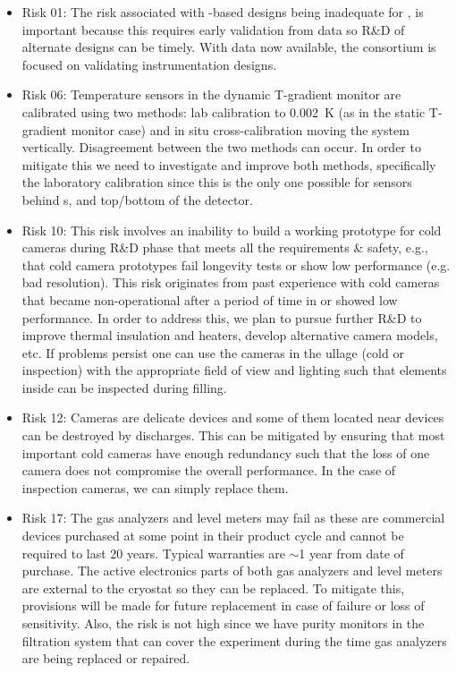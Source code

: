 \begin{itemize}
    \item Risk 01: The risk associated with -based designs being inadequate for , is important because this requires early validation from  data so R\&D of alternate designs can be timely. With  data now available, the consortium is focused on validating instrumentation designs. 
    \item Risk 06: Temperature sensors in the dynamic T-gradient monitor are calibrated using two methods: lab calibration to \SI{0.002}{K}  (as in the static T-gradient monitor case) and in situ cross-calibration moving the system vertically. Disagreement between the two methods can occur. In order to mitigate this we need to investigate and improve both methods, specifically the laboratory calibration since this is the only one possible for sensors behind s, and top/bottom of the detector.  
    \item Risk 10: This risk involves an inability to build a working prototype for cold cameras during R\&D phase that meets all the requirements \& safety, e.g., that cold camera prototypes fail longevity tests or show low performance (e.g. bad resolution). This risk originates from past experience with cold cameras that became non-operational after a period of time in  or showed low performance. In order to address this, we plan to pursue further R\&D to improve thermal insulation and heaters, develop alternative camera models, etc. If problems persist one can use the cameras in the ullage (cold or inspection) with the appropriate field of view and lighting such that elements inside  can be inspected during filling.
    \item Risk 12: Cameras are delicate devices and some of them located near  devices can be destroyed by  discharges. This can be mitigated by ensuring that most important cold cameras have enough redundancy such that the loss of one camera does not compromise the overall performance. In the case of inspection cameras, %
    we can simply replace them.
    \item Risk 17: The gas analyzers and level meters may fail as these are commercial devices purchased at some point in their product cycle and cannot be required to last 20 years. Typical warranties are $\sim$1 year from date of purchase. The active electronics parts of both gas analyzers and level meters are external to the cryostat so they can be replaced. To mitigate this, provisions will be made for future replacement in case of failure or loss of sensitivity. Also, the risk is not high since we have purity monitors in the filtration system that can cover the experiment during the time gas analyzers are being replaced or repaired. 
\end{itemize}

